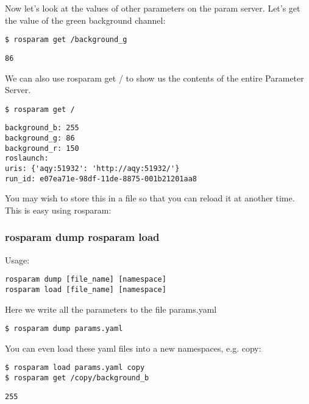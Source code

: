 Now let's look at the values of other parameters on the param server. Let's get the value of the green background channel:

\begin{lstlisting}[breaklines=true languages=bash]
$ rosparam get /background_g 
\end{lstlisting}

\begin{lstlisting}[breaklines=true languages=bash]
86
\end{lstlisting}

We can also use rosparam get / to show us the contents of the entire Parameter Server.

\begin{lstlisting}[breaklines=true languages=bash]
$ rosparam get /
\end{lstlisting}

\begin{lstlisting}[breaklines=true languages=bash]
background_b: 255
background_g: 86
background_r: 150
roslaunch:
uris: {'aqy:51932': 'http://aqy:51932/'}
run_id: e07ea71e-98df-11de-8875-001b21201aa8
\end{lstlisting}

You may wish to store this in a file so that you can reload it at another time. This is easy using rosparam:

\subsubsection{rosparam dump rosparam load}
Usage:

\begin{lstlisting}[breaklines=true languages=bash]
rosparam dump [file_name] [namespace]
rosparam load [file_name] [namespace]
\end{lstlisting}

Here we write all the parameters to the file params.yaml

\begin{lstlisting}[breaklines=true languages=bash]
$ rosparam dump params.yaml
\end{lstlisting}

You can even load these yaml files into a new namespaces, e.g. copy:
\begin{lstlisting}[breaklines=true languages=bash]
$ rosparam load params.yaml copy
$ rosparam get /copy/background_b
\end{lstlisting}

\begin{lstlisting}
255
\end{lstlisting}

